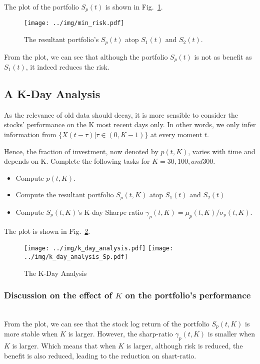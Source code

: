 \documentclass[runningheads]{llncs}
\begin{document}
The plot of the portfolio $S_p(t)$ is shown in Fig.~\ref{fig:portfolio}.

\begin{figure}
    \centering
    \texttt{[image: ../img/min\_risk.pdf]}
    \caption{The resultant portfolio's $S_p(t)$ atop $S_1(t)$ and $S_2(t)$.}
    \label{fig:portfolio}
\end{figure}

From the plot, we can see that although the portfolio $S_p(t)$ is not as benefit as $S_1(t)$, it indeed reduces the risk.

\subsection{A K-Day Analysis}
As the relevance of old data should decay, it is more sensible to consider the
stocks' performance on the K most recent days only. In other words, we only
infer information from $\{X(t-\tau)|\tau\in(0,K-1)\}$ at every moment $t$.

Hence, the fraction of investment, now denoted by $p(t, K)$, varies with time
and depends on K. Complete the following tasks for $K = 30, 100, and 300$.

\begin{itemize}
    \item Compute $p(t, K)$.
    \item Compute the resultant portfolio $S_p(t,K)$ atop $S_1(t)$ and $S_2(t)$
    \item Compute $S_p(t,K)$'s K-day Sharpe ratio $\gamma_p(t,K)=\mu_p(t,K)/\sigma_p(t,K)$.
\end{itemize}

The plot is shown in Fig.~\ref{fig:portfolio_k}.

\begin{figure}
    \centering
    \texttt{[image: ../img/k\_day\_analysis.pdf]}
    \texttt{[image: ../img/k\_day\_analysis\_Sp.pdf]}
    \caption{The K-Day Analysis}
    \label{fig:portfolio_k}
\end{figure}

\subsubsection*{Discussion on the effect of $K$ on the portfolio's performance}
\hfill\\
From the plot, we can see that the stock log return of the portfolio $S_p(t,K)$ is more stable when $K$ is larger.
However, the sharp-ratio $\gamma_p(t,K)$ is smaller when $K$ is larger.
Which means that when $K$ is larger, although risk is reduced, the benefit is also reduced, leading to the reduction on shart-ratio.
\end{document}
